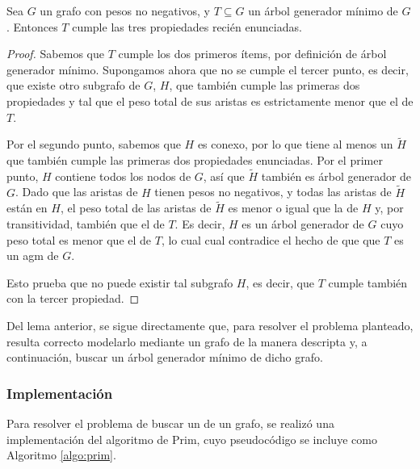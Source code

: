     \begin{lema}
    Sea $G$ un grafo con pesos no negativos, y $T \subseteq G$ un árbol
    generador mínimo de $G$. Entonces $T$ cumple las tres propiedades recién
    enunciadas.
    \end{lema}
    \begin{proof}
    Sabemos que $T$ cumple los dos primeros ítems, por definición de árbol
    generador mínimo.
    Supongamos ahora que no se cumple el tercer punto, es decir, que existe
    otro subgrafo de $G$, $H$, que también cumple las primeras dos propiedades
    y tal que el peso total de sus aristas es estrictamente menor que el de
    $T$.

    Por el segundo punto, sabemos que $H$ es conexo, por lo que tiene al menos
    un  $\tilde{H}$ que también cumple las primeras dos
    propiedades enunciadas. Por el primer punto, $H$ contiene todos los
    nodos de $G$, así que $\tilde{H}$ también es árbol generador de $G$.
    Dado que las aristas de $H$ tienen pesos no negativos, y todas las aristas
    de $\tilde{H}$ están en $H$, el peso total de las aristas de $\tilde{H}$
    es menor o igual que la de $H$ y, por transitividad, también que el de
    $T$. Es decir, $H$ es un árbol generador de $G$ cuyo peso total es menor
    que el de $T$, lo cual cual contradice el hecho de que que $T$ es un \acr
    {agm} de $G$.

    Esto prueba que no puede existir tal subgrafo $H$, es decir, que $T$
    cumple también con la tercer propiedad.
    \end{proof}

    Del lema anterior, se sigue directamente que, para resolver el problema
    planteado, resulta correcto modelarlo mediante un grafo de la manera
    descripta y, a continuación, buscar un árbol generador mínimo de dicho
    grafo.

    \subsubsection{Implementación}
    Para resolver el problema de buscar un  de un grafo,
    se realizó una implementación del algoritmo de Prim, cuyo pseudocódigo
    se incluye como Algoritmo \ref{algo:prim}.


